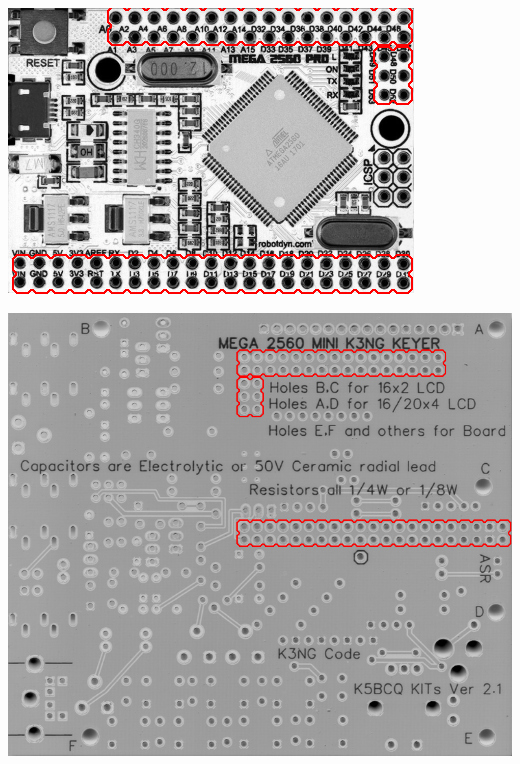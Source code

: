 \documentclass[11pt]{article}
\begin{document}
\begin{center}
\includegraphics[width=.9\linewidth]{../png/3.1/mega2560-top-headers.png}
\end{center}
\begin{center}
\includegraphics[width=.9\linewidth]{../png/3.1/pcb-bot-mega2560-headers.png}
\end{center}
\newpage
\end{document}
